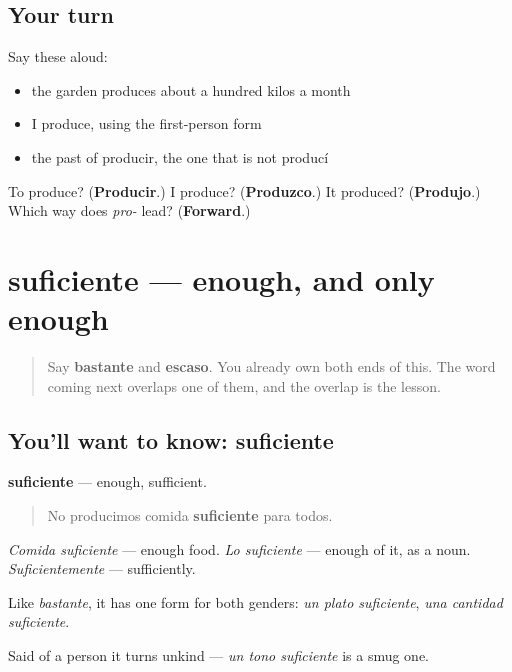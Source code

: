 \subsection*{Your turn}
Say these aloud:

\begin{itemize}
\raggedright
  \item the garden produces about a hundred kilos a month
  \item I produce, using the first-person form
  \item the past of producir, the one that is not producí
\end{itemize}

\begin{tcolorbox}[breakable,colback=teal!4,colframe=teal!35!black,title={Before you move on}]
To produce? (\textbf{Producir}.) I produce? (\textbf{Produzco}.) It produced? (\textbf{Produjo}.) Which way does \emph{pro-} lead? (\textbf{Forward}.)
\end{tcolorbox}
\section[suficiente]{suficiente — enough, and only enough}

\label{lesson:ES-C467-suficiente}



\begin{quote}
Say \textbf{bastante} and \textbf{escaso}. You already own both ends of this. The word coming next overlaps one of them, and the overlap is the lesson.
\end{quote}

\subsection*{You'll want to know: suficiente}
\textbf{suficiente} — enough, sufficient.

\begin{quote}
No producimos comida \textbf{suficiente} para todos.
\end{quote}

\emph{Comida suficiente} — enough food. \emph{Lo suficiente} — enough of it, as a noun. \emph{Suficientemente} — sufficiently.

Like \emph{bastante}, it has one form for both genders: \emph{un plato suficiente}, \emph{una cantidad suficiente}.

Said of a person it turns unkind — \emph{un tono suficiente} is a smug one.

